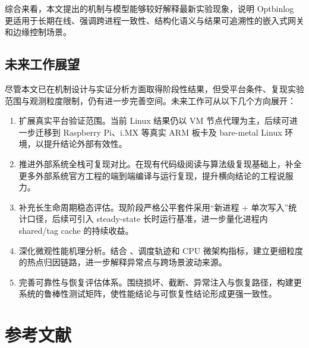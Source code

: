 综合来看，本文提出的机制与模型能够较好解释最新实验现象，说明 Optbinlog 更适用于长期在线、强调跨进程一致性、结构化语义与结果可追溯性的嵌入式网关和边缘控制场景。

\subsection{未来工作展望}\label{ux672aux6765ux5de5ux4f5cux5c55ux671b}

尽管本文已在机制设计与实证分析方面取得阶段性结果，但受平台条件、复现实验范围与观测粒度限制，仍有进一步完善空间。未来工作可从以下几个方向展开：

\begin{enumerate}
\def\labelenumi{\arabic{enumi}.}
\tightlist
\item
  扩展真实平台验证范围。当前 Linux 结果仍以 VM 节点代理为主，后续可进一步迁移到 Raspberry Pi、i.MX 等真实 ARM 板卡及 bare-metal Linux 环境，以提升结论外部有效性。
\item
  推进外部系统全栈可复现对比。在现有代码级阅读与算法级复现基础上，补全更多外部系统官方工程的端到端编译与运行复现，提升横向结论的工程说服力。
\item
  补充长生命周期稳态评估。现阶段严格公平套件采用``新进程 + 单次写入''统计口径，后续可引入 steady-state 长时运行基准，进一步量化进程内 shared/tag cache 的持续收益。
\item
  深化微观性能机理分析。结合 、调度轨迹和 CPU 微架构指标，建立更细粒度的热点归因链路，进一步解释异常点与跨场景波动来源。
\item
  完善可靠性与恢复评估体系。围绕损坏、截断、异常注入与恢复路径，构建更系统的鲁棒性测试矩阵，使性能结论与可恢复性结论形成更强一致性。
\end{enumerate}

\clearpage

\section*{参考文献}


